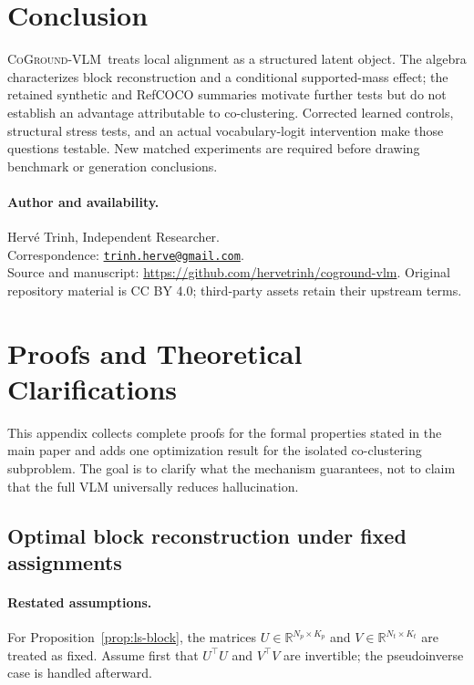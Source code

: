 \documentclass[11pt,a4paper]{article}
\newcommand{\method}{\textsc{CoGround-VLM}}
\newcommand{\R}{\mathbb{R}}
\begin{document}
\section{Conclusion}
\label{sec:conclusion}

\method\ treats local alignment as a structured latent object. The algebra characterizes block reconstruction and a conditional supported-mass effect; the retained synthetic and RefCOCO summaries motivate further tests but do not establish an advantage attributable to co-clustering. Corrected learned controls, structural stress tests, and an actual vocabulary-logit intervention make those questions testable. New matched experiments are required before drawing benchmark or generation conclusions.

\paragraph{Author and availability.}
Herv\'e Trinh, Independent Researcher.\\Correspondence: \href{mailto:trinh.herve@gmail.com}{\texttt{trinh.herve@gmail.com}}.\\Source and manuscript: \url{https://github.com/hervetrinh/coground-vlm}. Original repository material is CC BY 4.0; third-party assets retain their upstream terms.

\clearpage
\begingroup
\small
\setlength{\bibsep}{2pt}


\endgroup

\clearpage
\appendix
\section{Proofs and Theoretical Clarifications}
\label{app:theory}

This appendix collects complete proofs for the formal properties stated in the main paper and adds one optimization result for the isolated co-clustering subproblem. The goal is to clarify what the mechanism guarantees, not to claim that the full VLM universally reduces hallucination.

\subsection{Optimal block reconstruction under fixed assignments}

\paragraph{Restated assumptions.}
For Proposition~\ref{prop:ls-block}, the matrices $U \in \R^{N_p \times K_p}$ and $V \in \R^{N_t \times K_t}$ are treated as fixed. Assume first that $U^\top U$ and $V^\top V$ are invertible; the pseudoinverse case is handled afterward.
\end{document}
